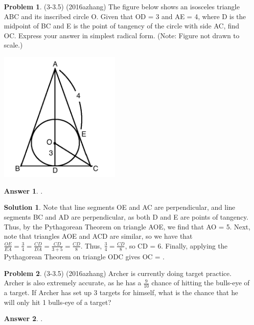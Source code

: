 \documentclass{article}
\theoremstyle{definition}
\newtheorem{problem}{Problem}
\newtheorem*{solution}{Solution}
\newtheorem*{answer}{Answer}
\begin{document}
\begin{problem}
(3-3.5) (2016azhang) The figure below shows an isosceles triangle ABC and its inscribed circle O. Given that OD = 3 and AE = 4, where D is the midpoint of BC and E is the point of tangency of the circle with side AC, find OC. Express your answer in simplest radical form. (Note: Figure not drawn to scale.)
\begin{center}
\includegraphics[width=6cm]{triangle.png}
\end{center}
\end{problem}

\begin{answer}
.
\end{answer}

\begin{solution}
Note that line segments OE and AC are perpendicular, and line segments BC and AD are perpendicular, as both D and E are points of tangency. Thus, by the Pythagorean Theorem on triangle AOE, we find that AO = 5. Next, note that triangles AOE and ACD are similar, so we have that $\frac{OE}{EA} = \frac{3}{4} = \frac{CD}{DA} = \frac{CD}{3+5} = \frac{CD}{8}$. Thus, $\frac{3}{4} = \frac{CD}{8}$, so CD = 6. Finally, applying the Pythagorean Theorem on triangle ODC gives OC = .
\end{solution}

\begin{problem}
(3-3.5) (2016azhang) Archer is currently doing target practice. Archer is also extremely accurate, as he has a $\frac{9}{10}$ chance of hitting the bulls-eye of a target. If Archer has set up 3 targets for himself, what is the chance that he will only hit 1 bulls-eye of a target?
\end{problem}

\begin{answer}
.
\end{answer}
\end{document}
